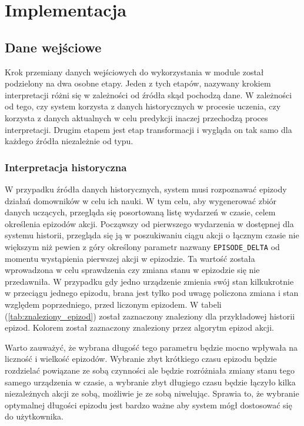 \chapter{Implementacja}

\section{Dane wejściowe}
Krok przemiany danych wejściowych do wykorzystania w module został podzielony na dwa osobne etapy. Jeden z tych etapów, nazywany krokiem interpretacji różni się w zależności od źródła skąd pochodzą dane. W zależności od tego, czy system korzysta z danych historycznych w procesie uczenia, czy korzysta z danych aktualnych w celu predykcji inaczej przechodzą proces interpretacji. Drugim etapem jest etap transformacji i wygląda on tak samo dla każdego źródła niezależnie od typu.

\subsection{Interpretacja historyczna}
W przypadku źródła danych historycznych, system musi rozpoznawać epizody działań domowników w celu ich nauki. W tym celu, aby wygenerować zbiór danych uczących, przegląda się posortowaną listę wydarzeń w czasie, celem określenia epizodów akcji. Począwszy od pierwszego wydarzenia w dostępnej dla systemu historii, przegląda się ją w poszukiwaniu ciągu akcji o łącznym czasie nie większym niż pewien z góry określony parametr nazwany \verb+EPISODE_DELTA+ od momentu wystąpienia pierwszej akcji w epizodzie. Ta wartość została wprowadzona w celu sprawdzenia czy zmiana stanu w epizodzie się nie przedawniła. W przypadku gdy jedno urządzenie zmienia swój stan kilkukrotnie w przeciągu jednego epizodu, brana jest tylko pod uwagę policzona zmiana i stan względem poprzedniego, przed liczonym epizodem. W tabeli (\ref{tab:znaleziony_epizod}) został zaznaczony znaleziony dla przykładowej historii epizod. Kolorem został zaznaczony znaleziony przez algorytm epizod akcji. 

Warto zauważyć, że wybrana długość tego parametru będzie mocno wpływała na liczność i wielkość epizodów. Wybranie zbyt krótkiego czasu epizodu będzie rozdzielać powiązane ze sobą czynności ale będzie rozróżniała zmiany stanu tego samego urządzenia w czasie, a wybranie zbyt długiego czasu będzie łączyło kilka niezależnych akcji ze sobą, możliwie je ze sobą niwelując. Sprawia to, że wybranie optymalnej długości epizodu jest bardzo ważne aby system mógł dostosować się do użytkownika.

